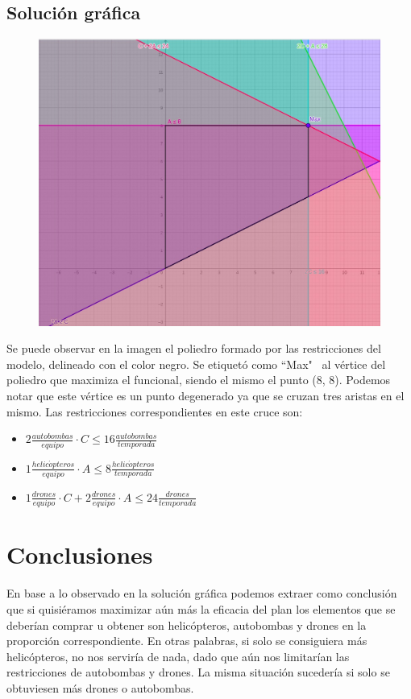 \documentclass[12pt]{article}
\begin{document}
\resizebox{0.82\textwidth}{!}{\usebox\myv}

\newpage

\subsection{Solución gráfica}

\begin{figure}[htbp]
    \centering
    \includegraphics[width=1\textwidth]{../assets/resolucion-grafica.jpeg}
\end{figure}

Se puede observar en la imagen el poliedro formado por las restricciones del modelo,
delineado con el color negro. Se etiquetó como ``Max" \
al vértice del poliedro
que maximiza el funcional, siendo el mismo el punto (8, 8). Podemos notar que este
vértice es un punto degenerado ya que se cruzan tres aristas en el mismo. Las restricciones
correspondientes en este cruce son:

\begin{itemize}
    \item $2 \frac{autobombas}{equipo} \cdot C \leq 16 \frac{autobombas}{temporada}$
    \item $1 \frac{helic\acute{o}pteros}{equipo} \cdot A \leq 8 \frac{helic\acute{o}pteros}{temporada}$
    \item $1 \frac{drones}{equipo} \cdot C + 2 \frac{drones}{equipo} \cdot A \leq 24 \frac{drones}{temporada}$
\end{itemize}

\section{Conclusiones}

En base a lo observado en la solución gráfica podemos extraer como conclusión que si quisiéramos maximizar aún más
la eficacia del plan los elementos que se deberían comprar u obtener son helicópteros, autobombas
y drones en la proporción correspondiente. En otras palabras, si solo se consiguiera más helicópteros,
no nos serviría de nada, dado que aún nos limitarían las restricciones de autobombas y drones.
La misma situación sucedería si solo se obtuviesen más drones o autobombas.
\end{document}
